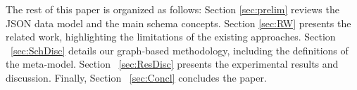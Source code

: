The rest of this paper is organized as follows: Section \ref{sec:prelim} reviews the JSON data model and the main schema concepts. Section \ref{sec:RW} presents the related work, highlighting the limitations of the existing approaches. Section ~\ref{sec:SchDisc} details our graph-based methodology, including the definitions of the meta-model. Section ~\ref{sec:ResDisc}  presents the experimental results and discussion. Finally, Section ~\ref{sec:Concl} concludes the paper.


